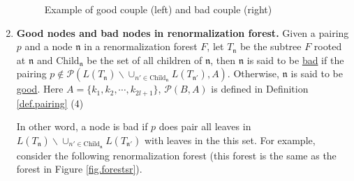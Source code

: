 \begin{defn}
\begin{enumerate}
\begin{figure}[H]
{\begin{tikzpicture}
            
        \end{tikzpicture}
        }
            \caption{Example of good couple (left) and bad couple (right)}
            \label{fig.goodbad}
        \end{figure}

        \item \textbf{Good nodes and bad nodes in renormalization forest.} Given a pairing $p$ and a node $\mathfrak{n}$ in a renormalization forest $F$, let $T_{\mathfrak{n}}$ be the subtree $F$ rooted at $\mathfrak{n}$ and $\text{Child}_{\mathfrak{n}}$ be the set of all children of $\mathfrak{n}$, then $\mathfrak{n}$ is said to be \underline{bad} if the pairing $p\notin \mathcal{P}(L(T_{\mathfrak{n}})\backslash\cup_{n'\in \text{Child}_{\mathfrak{n}}} L(T_{\mathfrak{n}'}),A)$. Otherwise, $\mathfrak{n}$ is said to be \underline{good}. Here $A=\{k_1,k_2,\cdots,k_{2l+1}\}$, $\mathcal{P}(B,A)$ is defined in Definition \ref{def.pairing} (4)
        
        In other word, a node is bad if $p$ does pair all leaves in $L(T_{\mathfrak{n}})\backslash\cup_{n'\in \text{Child}_{\mathfrak{n}}} L(T_{\mathfrak{n}'})$ with leaves in the this set. For example, consider the following renormalization forest (this forest is the same as the forest in Figure \ref{fig.forestsr}).
        \begin{figure}[H]
            \centering
\end{figure}
\end{enumerate}
\end{defn}
